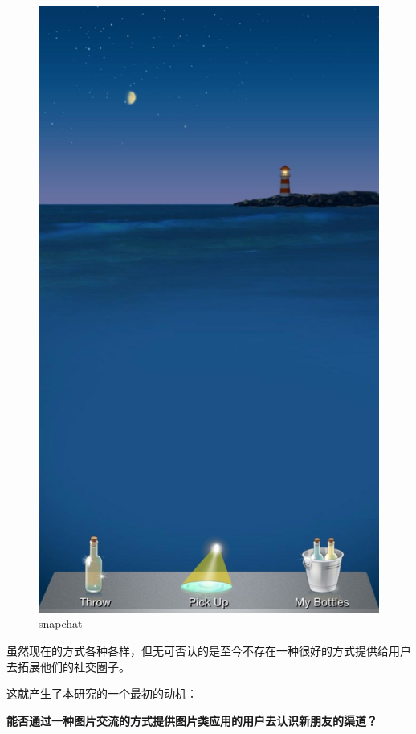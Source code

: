 \begin{figure}[h]
\begin{minipage}[t]{0.3\linewidth}
\includegraphics[width=\textwidth]{img/chap1/bottle.jpg}
\caption{snapchat\label{snapchat}}
\end{minipage}

\end{figure}

虽然现在的方式各种各样，但无可否认的是至今不存在一种很好的方式提供给用户去拓展他们的社交圈子。

这就产生了本研究的一个最初的动机：

 \textbf{能否通过一种图片交流的方式提供图片类应用的用户去认识新朋友的渠道？}

